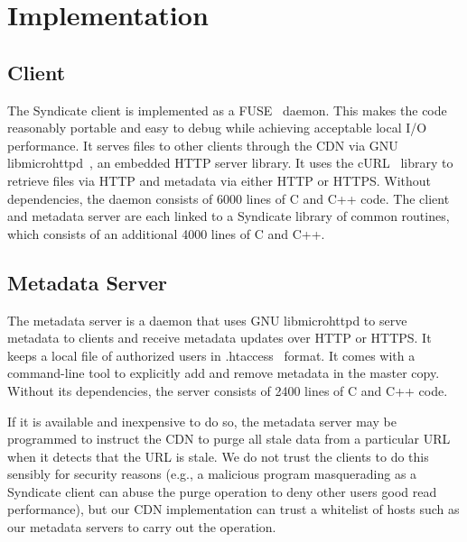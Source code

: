 \section{Implementation}

\subsection{Client}

The Syndicate client is implemented as a FUSE~\cite{FUSE} daemon.
This makes the code reasonably portable and easy to debug while
achieving acceptable local I/O performance.  It serves files to other
clients through the CDN via GNU libmicrohttpd~\cite{libmicrohttpd}, an
embedded HTTP server library.  It uses the cURL~\cite{cURL} library to
retrieve files via HTTP and metadata via either HTTP or HTTPS.
Without dependencies, the daemon consists of 6000 lines of C and C++
code.  The client and metadata server are each linked to a Syndicate
library of common routines, which consists of an additional 4000
lines of C and C++.

\subsection{Metadata Server}

The metadata server is a daemon that uses GNU libmicrohttpd to serve
metadata to clients and receive metadata updates over HTTP or HTTPS.
It keeps a local file of authorized users in .htaccess~\cite{Apache}
format.  It comes with a command-line tool to explicitly add and remove metadata in the
master copy.  Without its dependencies, the server consists of 2400
lines of C and C++ code.

If it is available and inexpensive to do so, the metadata server may
be programmed to instruct the CDN to purge all stale data from a
particular URL when it detects that the URL is stale.  We do not trust
the clients to do this sensibly for security reasons (e.g., a
malicious program masquerading as a Syndicate client can abuse the
purge operation to deny other users good read performance), but our
CDN implementation can trust a whitelist of hosts such as our metadata
servers to carry out the operation.




